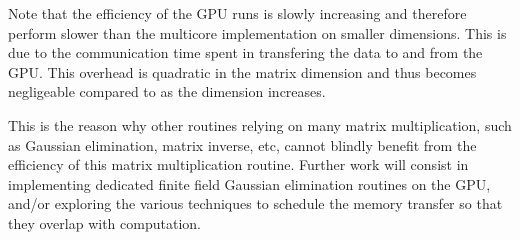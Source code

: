 Note that the efficiency of the GPU runs is slowly increasing and therefore perform slower than the multicore
implementation on smaller dimensions. This is due to the communication  time spent in transfering the data to and from
the GPU. This overhead is quadratic in the matrix dimension and thus becomes negligeable compared to as the dimension
increases.

This is the reason why other routines relying on many matrix multiplication, such as Gaussian elimination, matrix
inverse, etc, cannot blindly benefit from the efficiency of this matrix multiplication routine. Further work will
consist in implementing dedicated finite field Gaussian elimination routines on the GPU, and/or exploring the various
techniques to schedule the memory transfer so that they overlap with computation.





